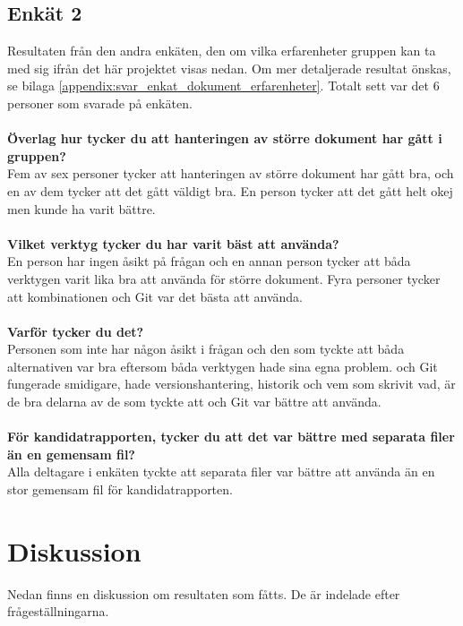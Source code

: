 \subsection{Enkät 2}
Resultaten från den andra enkäten, den om vilka erfarenheter gruppen kan ta med sig ifrån det här projektet visas nedan. Om mer detaljerade resultat önskas, se bilaga \ref{appendix:svar_enkat_dokument_erfarenheter}. Totalt sett var det 6 personer som svarade på enkäten.\\\\
\textbf{Överlag hur tycker du att hanteringen av större dokument har gått i gruppen?}\\
Fem av sex personer tycker att hanteringen av större dokument har gått bra, och en av dem tycker att det gått väldigt bra. En person tycker att det gått helt okej men kunde ha varit bättre.\\\\
\textbf{Vilket verktyg tycker du har varit bäst att använda?}\\
En person har ingen åsikt på frågan och en annan person tycker att båda verktygen varit lika bra att använda för större dokument. Fyra personer tycker att kombinationen \latex och Git var det bästa att använda.\\\\
\textbf{Varför tycker du det?}\\
Personen som inte har någon åsikt i frågan och den som tyckte att båda alternativen var bra eftersom båda verktygen hade sina egna problem. \latex och Git fungerade smidigare, hade versionshantering, historik och vem som skrivit vad, är de bra delarna av de som tyckte att \latex och Git var bättre att använda.\\\\
\textbf{För kandidatrapporten, tycker du att det var bättre med separata filer än en gemensam fil?}\\
Alla deltagare i enkäten tyckte att separata filer var bättre att använda än en stor gemensam fil för kandidatrapporten.

\newpage
\section{Diskussion}
\label{sec:discussion-tuhkala}
Nedan finns en diskussion om resultaten som fåtts. De är indelade efter frågeställningarna.

